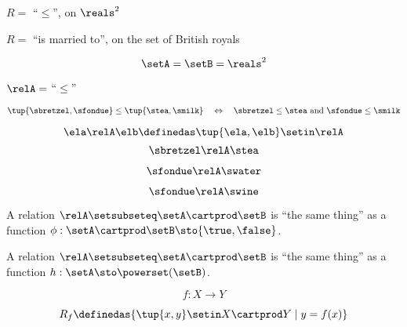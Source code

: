 {\begin{forslides}
        \begin{center}
            $R =$ ``$\leq$'', on $\reals^2 $ \label{eq:slides-11}
        \end{center}

        \begin{center}
            $R =$ ``is married to'', on the set of British royals \label{eq:slides-11a}
        \end{center}

        \begin{equation}
            \setA = \setB = \reals^2 \label{eq:slides-12}
        \end{equation}

        \begin{center}
            $\relA =$ ``$\leq$''  \label{eq:slides-13}
        \end{center}

        \begin{equation}
            \tup{\sbretzel, \sfondue} \leq \tup{\stea, \smilk} \quad \Leftrightarrow \quad \sbretzel \leq \stea \text{ and } \sfondue \leq \smilk \label{eq:slides-14}
        \end{equation}

        \begin{equation}
            \ela \relA \elb \definedas \tup{\ela, \elb} \setin \relA  \label{eq:slides-15}
        \end{equation}
        \begin{equation}
            \sbretzel \relA \stea \label{eq:slides-16}
        \end{equation}

        \begin{equation}
            \sfondue \relA \swater \label{eq:slides-17}
        \end{equation}

        \begin{equation}
            \sfondue \relA \swine \label{eq:slides-18}
        \end{equation}

        A relation $\relA \setsubseteq \setA \cartprod \setB$ is ``the same thing'' as a function $\phi : \setA \cartprod \setB \sto \{\true, \false\}$.

        A relation $\relA \setsubseteq \setA \cartprod \setB$ is ``the same thing'' as a function $h : \setA  \sto \powerset (\setB)$.

        \begin{equation}
            f : X \to Y
        \end{equation}

        \begin{equation}
            R_f \definedas \{ \tup{x, y} \setin X \cartprod Y \mid y = f(x) \}
        \end{equation}

    \end{forslides}
}

